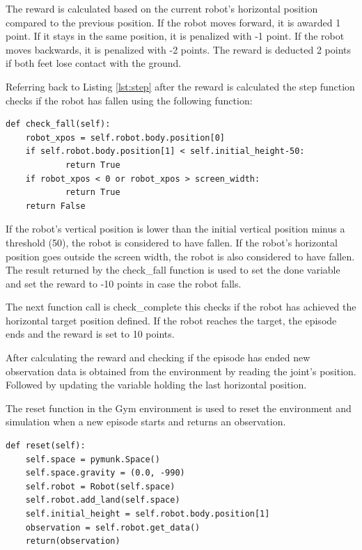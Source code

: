 The reward is calculated based on the current robot's horizontal position compared to the previous position.
If the robot moves forward, it is awarded 1 point. If it stays in the same position, it is penalized with -1 point. If the robot moves backwards, it is penalized with -2 points. The reward is deducted 2 points if both feet lose contact with the ground.

Referring back to Listing \ref{lst:step} after the reward is calculated the step function checks if the robot has fallen using the following function:
\begin{lstlisting}
def check_fall(self):
    robot_xpos = self.robot.body.position[0]
    if self.robot.body.position[1] < self.initial_height-50:
            return True
    if robot_xpos < 0 or robot_xpos > screen_width:
            return True
    return False
\end{lstlisting}

If the robot's vertical position is lower than the initial vertical position minus a threshold (50), the robot is considered to have fallen.
If the robot's horizontal position goes outside the screen width, the robot is also considered to have fallen. The result returned by the check\_fall function is 
used to set the done variable and set the reward to -10 points in case the robot falls.

The next function call is check\_complete this checks if the robot has achieved the horizontal target position defined.
If the robot reaches the target, the episode ends and the reward is set to 10 points.

After calculating the reward and checking if the episode has ended new observation data is obtained from the environment by reading the joint's position.
Followed by updating the variable holding the last horizontal position.

The reset function in the Gym environment is used to reset the environment and simulation when a new episode starts and returns an observation.

\begin{lstlisting}
def reset(self):
    self.space = pymunk.Space()
    self.space.gravity = (0.0, -990)
    self.robot = Robot(self.space)
    self.robot.add_land(self.space)
    self.initial_height = self.robot.body.position[1]
    observation = self.robot.get_data()
    return(observation)
\end{lstlisting}

